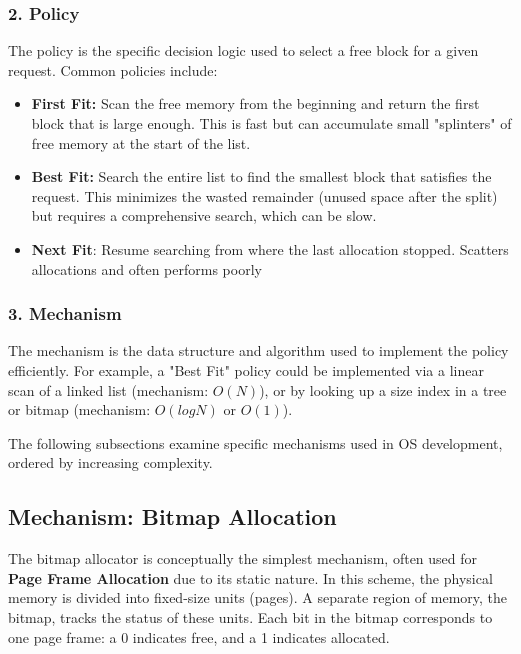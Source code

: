 \documentclass[a4paper,10pt,twoside]{report}
\theoremstyle{definition}
\begin{document}
\subsubsection{2. Policy}
The policy is the specific decision logic used to select a free block for a given request. Common policies include:
\begin{itemize}
    \item \textbf{First Fit:} Scan the free memory from the beginning and return the first block that is large enough. This is fast but can accumulate small "splinters" of free memory at the start of the list.
    \item \textbf{Best Fit:} Search the entire list to find the smallest block that satisfies the request. This minimizes the wasted remainder (unused space after the split) but requires a comprehensive search, which can be slow.
    \item \textbf{Next Fit}: Resume searching from where the last allocation stopped. Scatters allocations and often performs poorly
\end{itemize}

\subsubsection{3. Mechanism}
The mechanism is the data structure and algorithm used to implement the policy efficiently. For example, a "Best Fit" policy could be implemented via a linear scan of a linked list (mechanism: $O(N)$), or by looking up a size index in a tree or bitmap (mechanism: $O(log N)$ or $O(1)$).

The following subsections examine specific mechanisms used in OS development, ordered by increasing complexity.

\subsection{Mechanism: Bitmap Allocation}

The bitmap allocator is conceptually the simplest mechanism, often used for \textbf{Page Frame Allocation} due to its static nature. In this scheme, the physical memory is divided into fixed-size units (pages). A separate region of memory, the bitmap, tracks the status of these units. Each bit in the bitmap corresponds to one page frame: a 0 indicates free, and a 1 indicates allocated.
\end{document}

